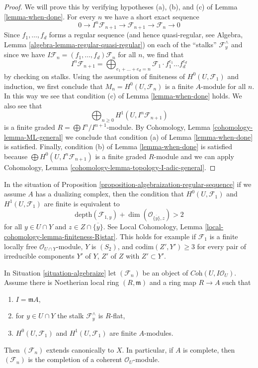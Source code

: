 \begin{proof}
We will prove this by verifying hypotheses (a), (b), and (c) of
Lemma \ref{lemma-when-done}.
For every $n$ we have a short exact sequence
$$
0 \to I^n\mathcal{F}_{n + 1} \to \mathcal{F}_{n + 1} \to \mathcal{F}_n \to 0
$$
Since $f_1, \ldots, f_d$ forms a regular sequence (and hence
quasi-regular, see Algebra, Lemma \ref{algebra-lemma-regular-quasi-regular})
on each of the ``stalks'' $\mathcal{F}_y^\wedge$ and since we have
$I\mathcal{F}_n = (f_1, \ldots, f_d)\mathcal{F}_n$ for all $n$,
we find that
$$
I^n\mathcal{F}_{n + 1} =
\bigoplus\nolimits_{e_1 + \ldots + e_d = n} \mathcal{F}_1 \cdot
f_1^{e_1} \ldots f_d^{e_d}
$$
by checking on stalks. Using the assumption of finiteness of
$H^0(U, \mathcal{F}_1)$ and induction, we first conclude that
$M_n = H^0(U, \mathcal{F}_n)$ is a finite $A$-module for all $n$.
In this way we see that condition (c) of Lemma \ref{lemma-when-done} holds.
We also see that
$$
\bigoplus\nolimits_{n \geq 0} H^1(U, I^n\mathcal{F}_{n + 1})
$$
is a finite graded $R = \bigoplus I^n/I^{n +1}$-module.
By Cohomology, Lemma \ref{cohomology-lemma-ML-general}
we conclude that condition (a) of
Lemma \ref{lemma-when-done} is satisfied. Finally, condition (b) of
Lemma \ref{lemma-when-done} is satisfied because
$\bigoplus H^0(U, I^n\mathcal{F}_{n + 1})$ is a finite graded $R$-module
and we can apply
Cohomology, Lemma \ref{cohomology-lemma-topology-I-adic-general}.
\end{proof}

\begin{remark}
\label{remark-interesting-case-ter}
In the situation of
Proposition \ref{proposition-algebraization-regular-sequence}
if we assume $A$ has a dualizing complex, then
the condition that $H^0(U, \mathcal{F}_1)$ and
$H^1(U, \mathcal{F}_1)$ are finite is equivalent to
$$
\text{depth}(\mathcal{F}_{1, y}) +
\dim(\mathcal{O}_{\overline{\{y\}}, z}) > 2
$$
for all $y \in U \cap Y$ and $z \in Z \cap \overline{\{y\}}$.
See Local Cohomology, Lemma \ref{local-cohomology-lemma-finiteness-Rjstar}.
This holds for example if $\mathcal{F}_1$ is a finite locally free
$\mathcal{O}_{U \cap Y}$-module, $Y$ is $(S_2)$, and
$\text{codim}(Z', Y') \geq 3$ for every pair of irreducible components
$Y'$ of $Y$, $Z'$ of $Z$ with $Z' \subset Y'$.
\end{remark}

\begin{proposition}
\label{proposition-algebraization-flat}
In Situation \ref{situation-algebraize} let
$(\mathcal{F}_n)$ be an object of $\textit{Coh}(U, I\mathcal{O}_U)$.
Assume there is Noetherian local ring $(R, \mathfrak m)$ and a ring
map $R \to A$ such that
\begin{enumerate}
\item $I = \mathfrak m A$,
\item for $y \in U \cap Y$ the stalk $\mathcal{F}_y^\wedge$ is $R$-flat,
\item $H^0(U, \mathcal{F}_1)$ and $H^1(U, \mathcal{F}_1)$ are finite
$A$-modules.
\end{enumerate}
Then $(\mathcal{F}_n)$ extends canonically to $X$. In particular, if $A$
is complete, then $(\mathcal{F}_n)$ is the completion of a coherent
$\mathcal{O}_U$-module.
\end{proposition}

